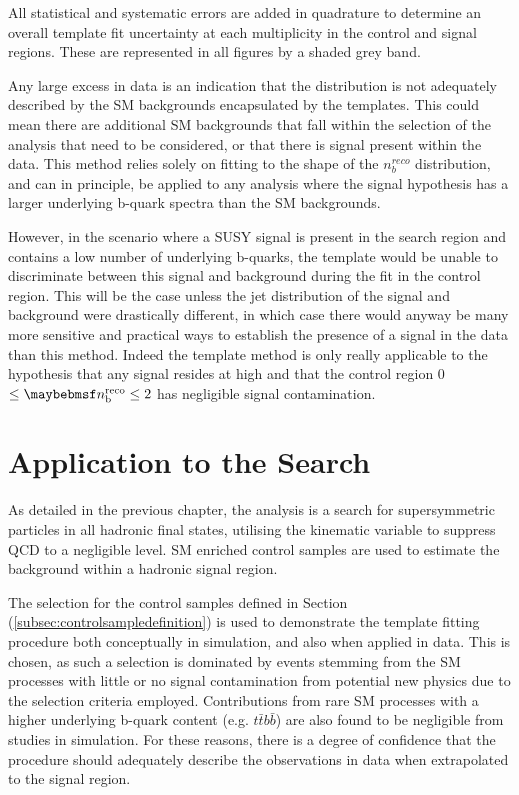 All statistical and systematic errors are added in quadrature to determine an overall template fit uncertainty at each \nbreco multiplicity in the control and signal regions. These are represented in all figures by a shaded grey band. 

Any large excess in data is an indication that the \nbreco distribution is not adequately described by the \ac{SM} backgrounds encapsulated by the templates. This could mean there are additional \ac{SM} backgrounds that fall within the selection of the analysis that need to be considered, or that there is signal present within the data. This method relies solely on fitting to the shape of the $n_{b}^{reco}$ distribution, and can in principle, be applied to any analysis where the signal hypothesis has a larger underlying b-quark spectra than the \ac{SM} backgrounds. 

However, in the scenario where a \ac{SUSY} signal is present in the search region and contains a low number of underlying b-quarks, the template would be unable to discriminate between this signal and background during the fit in the control region. This will be the case unless the jet \pt distribution of the signal and background were drastically different, in which case there would anyway be many more sensitive and practical ways to establish the presence of a signal in the data than this method. Indeed the template method is only really applicable to the hypothesis that any signal resides at high \nbreco and that the control region 0 $\leq \nbreco \leq 2$ has negligible signal contamination. 

\FloatBarrier
\section{ Application to the \alphat Search}
\label{sec:templateapplication}

As detailed in the previous chapter, the \alphat analysis is a search for supersymmetric particles in all hadronic final states, utilising the kinematic variable \alphat to suppress QCD to a negligible level. \ac{SM} enriched control samples are used to estimate the background within a hadronic signal region. 

The selection for the \mupjets control samples defined in Section (\ref{subsec:controlsampledefinition}) is used to demonstrate the template fitting procedure both conceptually in simulation, and also when applied in data. This is chosen, as such a selection is dominated by events stemming from the \ac{SM} processes with little or no signal contamination from potential new physics due to the selection criteria employed. Contributions from rare \ac{SM} processes with a higher underlying b-quark content (e.g. $t\bar{t}b\bar{b}$) are also found to be negligible from studies in simulation. For these reasons, there is a degree of confidence that the procedure should adequately describe the observations in data when extrapolated to the signal region.


